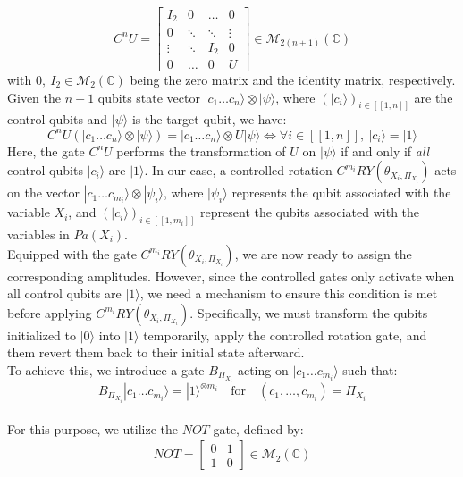 \[C^nU =
\left[
\begin{array}{cccc}
    I_2 & 0 & \hdots & 0 \\
    0 & \ddots & \ddots & \vdots \\
    \vdots & \ddots & I_2 & 0 \\
    0 & \hdots & 0 & U
\end{array}
\right]
\in \mathcal{M}_{2(n+1)}(\mathbb{C})
\]
with $0, \ I_2 \in \mathcal{M}_2(\mathbb{C})$ being the zero matrix and the identity matrix, respectively. 
\\[5pt]
Given the $n+1$ qubits state vector $|c_1 \hdots c_n\rangle \otimes |\psi\rangle$, where $(|c_i\rangle)_{i\in[\![1,n]\!]}$ are the control qubits and $|\psi\rangle$ is the target qubit, we have:
\[C^nU(|c_1 \hdots c_n\rangle \otimes |\psi\rangle) = |c_1 \hdots c_n\rangle \otimes U|\psi\rangle \iff \forall i \in [\![1,n]\!], \ |c_i\rangle = |1\rangle \]
Here, the gate $C^nU$ performs the transformation of $U$ on $|\psi\rangle$ if and only if \textit{all} control qubits $|c_i\rangle$ are $|1\rangle$. 
In our case, a controlled rotation $C^{m_i}RY(\theta_{X_i, \Pi_{X_i}})$ acts on the vector $|c_1 \hdots c_{m_i}\rangle \otimes |\psi_i\rangle$, where $|\psi_i\rangle$ represents the qubit associated with the variable $X_i$, and $(|c_i\rangle)_{i\in[\![1,m_i]\!]}$ represent the qubits associated with the variables in $ Pa(X_i)$.
\\[5pt]
Equipped with the gate $C^{m_i}RY(\theta_{X_i, \Pi_{X_i}})$, we are now ready to assign the corresponding amplitudes. However, since the controlled gates only activate when all control qubits are $|1\rangle$, we need a mechanism to ensure this condition is met before applying $C^{m_i}RY(\theta_{X_i, \Pi_{X_i}})$. Specifically, we must transform the qubits initialized to  $|0\rangle$ into $|1\rangle$ temporarily, apply the controlled rotation gate, and them revert them back to their initial state afterward.
\\[5pt]
To achieve this, we introduce a gate $B_{\Pi_{X_i}}$ acting on $|c_1 \hdots c_{m_i}\rangle$ such that:
\[
B_{\Pi_{X_i}}|c_1 \hdots c_{m_i}\rangle = |1\rangle^{\otimes m_i} \quad \mathrm{for} \quad (c_1,\hdots,c_{m_i}) = \Pi_{X_i}
\]
\\[5pt]
For this purpose, we utilize the $NOT$ gate, defined by:
\begin{align*}
NOT =
\left[
\begin{array}{cc}
    0 & 1 \\
    1 & 0
\end{array}
\right]
\in \mathcal{M}_{2}(\mathbb{C}) 
\end{align*}

